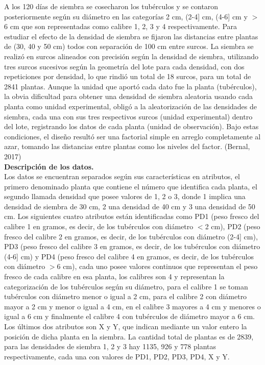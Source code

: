A los 120 días de siembra se cosecharon los tubérculos y se contaron posteriormente según su diámetro en las categorías 2 cm, (2-4] cm, (4-6] cm y $>$ 6 cm que son representadas como calibre 1, 2, 3 y 4 respectivamente. Para estudiar el efecto de la densidad de siembra se fijaron las distancias entre plantas de (30, 40 y 50 cm) todos con separación de 100 cm entre surcos. La siembra se realizó en surcos alineados con precisión según la densidad de siembra, utilizando tres surcos sucesivos según la geometría del lote para cada densidad, con dos repeticiones por densidad, lo que rindió un total de 18 surcos, para un total de 2841 plantas. Aunque la unidad que aportó cada dato fue la planta (tubérculos), la obvia dificultad para obtener una densidad de siembra aleatoria usando cada planta como unidad experimental, obligó a la aleatorización de las densidades de siembra, cada una con sus tres respectivos surcos (unidad experimental) dentro del lote, registrando los datos de cada planta (unidad de observación). Bajo estas condiciones, el diseño resultó ser una factorial simple en arreglo completamente al azar, tomando las distancias entre plantas como los niveles del factor. (Bernal, 2017)\\

\noindent
\textbf{Descripción de los datos.}\\

Los datos se encuentran separados según sus características en atributos, el primero denominado planta que contiene el número que identifica cada planta, el segundo llamada densidad que posee valores de 1, 2 o 3, donde 1 implica una densidad de siembra de 30 cm, 2 una densidad de 40 cm y 3 una densidad de 50 cm. Los siguientes cuatro atributos están identificadas como PD1 (peso fresco del calibre 1 en gramos, es decir, de los tubérculos con diámetro $<$2 cm), PD2 (peso fresco del calibre 2 en gramos, es decir, de los tubérculos con diámetro (2-4] cm), PD3 (peso fresco del calibre 3 en gramos, es decir, de los tubérculos con diámetro (4-6] cm) y PD4 (peso fresco del calibre 4 en gramos, es decir, de los tubérculos con diámetro
$>$6 cm), cada uno posee valores continuos que representan el peso fresco de cada calibre en esa planta, los calibres son 4 y representan la categorización de los tubérculos según su diámetro, para el calibre 1 se toman tubérculos con diámetro menor o igual a 2 cm, para el calibre 2 con diámetro mayor a 2 cm y menor o igual a 4 cm, en el calibre 3 mayores a 4 cm y menores o igual a 6 cm y finalmente el calibre 4 con tubérculos de diámetro mayor a 6 cm. Los últimos dos atributos son X y Y, que indican mediante un valor entero la posición de dicha planta en la siembra. La cantidad total de plantas es de 2839, para las densidades de siembra 1, 2 y 3 hay 1135, 926 y 778 plantas respectivamente, cada una con valores de PD1, PD2, PD3, PD4, X y Y.

